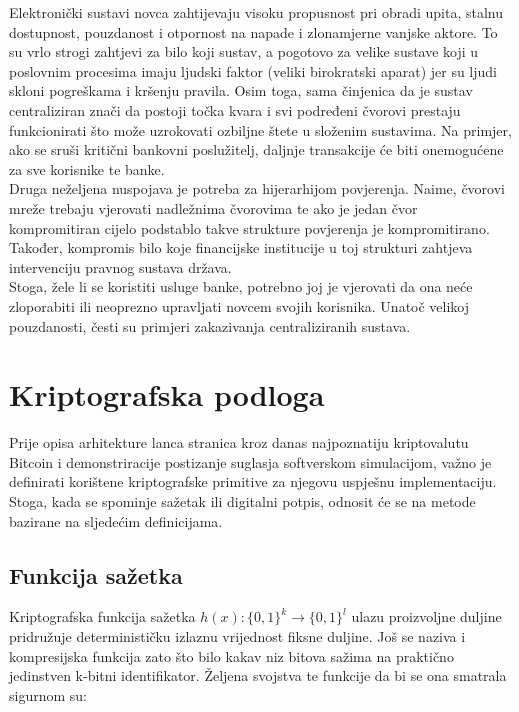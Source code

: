 \documentclass[utf8, zavrsni]{fer}
\begin{document}
Elektronički sustavi novca zahtijevaju visoku propusnost pri obradi upita, stalnu dostupnost, pouzdanost i otpornost na napade i zlonamjerne vanjske aktore. To su vrlo strogi zahtjevi za bilo koji sustav, a pogotovo za velike sustave koji u poslovnim procesima imaju ljudski faktor (veliki birokratski aparat) jer su ljudi skloni pogreškama i kršenju pravila. Osim toga, sama činjenica da je sustav centraliziran znači da postoji točka kvara i svi podređeni čvorovi prestaju funkcionirati što može uzrokovati ozbiljne štete u složenim sustavima. Na primjer, ako se sruši kritični bankovni poslužitelj, daljnje transakcije će biti onemogućene za sve korisnike te banke. \\

Druga neželjena nuspojava je potreba za hijerarhijom povjerenja. Naime, čvorovi mreže trebaju vjerovati nadležnima čvorovima te ako je jedan čvor kompromitiran cijelo podstablo takve strukture povjerenja je kompromitirano. Također, kompromis bilo koje financijske institucije u toj strukturi zahtjeva intervenciju pravnog sustava država. \\

Stoga, žele li se koristiti usluge banke, potrebno joj je vjerovati da ona neće zloporabiti ili neoprezno upravljati novcem svojih korisnika.
Unatoč velikoj pouzdanosti, česti su primjeri zakazivanja centraliziranih sustava.

\chapter{Kriptografska podloga}
Prije opisa arhitekture lanca stranica kroz danas najpoznatiju kriptovalutu Bitcoin i demonstriracije postizanje suglasja softverskom simulacijom, važno je definirati korištene kriptografske primitive za njegovu uspješnu implementaciju. Stoga, kada se spominje sažetak ili digitalni potpis, odnosit će se na metode bazirane na sljedećim definicijama.

\section{Funkcija sažetka}
Kriptografska funkcija sažetka $h(x): \{0,1\}^k \rightarrow \{0,1\}^l$ ulazu proizvoljne duljine pridružuje determinističku izlaznu vrijednost fiksne duljine. Još se naziva i kompresijska funkcija zato što bilo kakav niz bitova sažima na praktično jedinstven k-bitni identifikator. Željena svojstva te funkcije da bi se ona smatrala sigurnom su:
\end{document}
